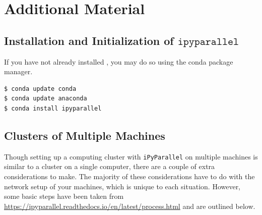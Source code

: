 %
%
%
%

\newpage
\section*{Additional Material}

\subsection*{Installation and Initialization of $\texttt{ipyparallel}$}

If you have not already installed , you may do so using the conda package manager.

\begin{lstlisting}[style=ShellInput]
$ conda update conda
$ conda update anaconda
$ conda install ipyparallel
\end{lstlisting}

\subsection*{Clusters of Multiple Machines}
Though setting up a computing cluster with \texttt{iPyParallel} on multiple machines is similar to a cluster on a single computer, there are a couple of extra considerations to make.
The majority of these considerations have to do with the network setup of your machines, which is unique to each situation.
However, some basic steps have been taken from \url{https://ipyparallel.readthedocs.io/en/latest/process.html} and are outlined below.

